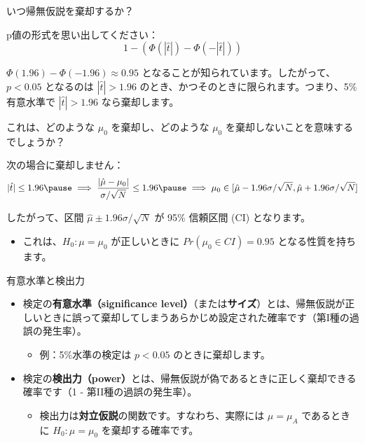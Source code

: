 \documentclass[11pt,handout]{beamer}
\newenvironment{wideitemize}{\itemize\addtolength{\itemsep}{10pt}}{\enditemize}
\begin{document}
\begin{frame}{いつ帰無仮説を棄却するか？}

\begin{wideitemize}
	\item 
	p値の形式を思い出してください：
	$$1 - \left(  \Phi(|\hat{t}|) - \Phi( -|\hat{t}| )  \right) $$
	
	\item
	$\Phi(1.96) - \Phi(-1.96) \approx 0.95$ となることが知られています。したがって、$p < 0.05$ となるのは $|\hat{t}| > 1.96$ のとき、かつそのときに限られます。つまり、5\%有意水準で $|\hat{t}| > 1.96$ なら棄却します。
	
	\pause
	\item
	これは、どのような $\mu_0$ を棄却し、どのような $\mu_0$ を棄却しないことを意味するでしょうか？
	
	\pause
	\item
	次の場合に棄却しません：
	$$ |\hat{t}| \leq 1.96 \pause \implies \dfrac{ |\hat\mu - \mu_0| }{ \sigma / \sqrt{N} } \leq 1.96 \pause \implies \mu_0 \in  [\hat\mu - 1.96 \sigma / \sqrt{N} , \hat\mu + 1.96 \sigma / \sqrt{N}]$$
\vspace{-0.5cm}
	\pause
	\item
	したがって、区間 $\hat\mu \pm 1.96 \sigma / \sqrt{N}$ が 95\% 信頼区間 (CI) となります。
	\smallskip

		\begin{itemize}
			\item 
			これは、$H_0: \mu = \mu_0$ が正しいときに $Pr( \mu_0 \in CI ) = 0.95$ となる性質を持ちます。
		\end{itemize}
	
\end{wideitemize}
	
\end{frame}

\begin{frame}{有意水準と検出力}
	
	\begin{itemize}
		\item 検定の\textbf{有意水準（significance level）}（または\textbf{サイズ}）とは、帰無仮説が正しいときに誤って棄却してしまうあらかじめ設定された確率です（第I種の過誤の発生率）。
		 \pause
		 \begin{itemize}
		 	\item 
		 	例：5\%水準の検定は $p<0.05$ のときに棄却します。
		 \end{itemize}
		\pause
		\bigskip

		\item 検定の\textbf{検出力（power）}とは、帰無仮説が偽であるときに正しく棄却できる確率です（1 - 第II種の過誤の発生率）。
		
			\begin{itemize}
				\item 
				検出力は\textbf{対立仮説}の関数です。すなわち、実際には $\mu = \mu_A$ であるときに $H_0:\mu=\mu_0$ を棄却する確率です。
			\end{itemize}
	\end{itemize}

\end{frame}
\end{document}
